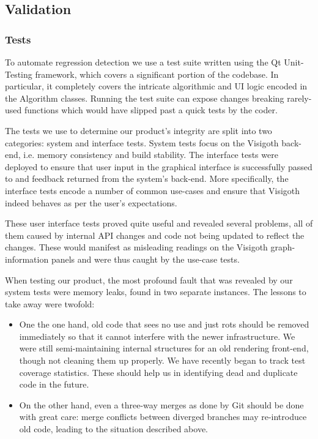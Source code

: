 \documentclass[a4paper,11pt,titlepage]{article}
\begin{document}
\subsection{Validation}

\subsubsection{Tests}
To automate regression detection we use a test suite written using
the Qt Unit-Testing framework, which covers a significant portion
of the codebase. In particular, it completely covers the intricate
algorithmic and UI logic encoded in the Algorithm classes. Running
the test suite can expose changes breaking rarely-used functions
which would have slipped past a quick tests by the coder.

The tests we use to determine our product's integrity are split
into two categories: system and interface tests. System tests focus
on the Visigoth back-end, i.e. memory consistency and build stability.
The interface tests were deployed to ensure that user input in the
graphical interface is successfully passed to and feedback returned
from the system's back-end. More specifically, the interface tests
encode a number of common use-cases and ensure that Visigoth indeed
behaves as per the user's expectations.

These user interface tests proved quite useful and revealed several
problems, all of them caused by internal API changes and code not
being updated to reflect the changes. These would manifest as
misleading readings on the Visigoth graph-information panels and
were thus caught by the use-case tests.

When testing our product, the most profound fault that was revealed
by our system tests were memory leaks, found in two separate
instances. The lessons to take away were twofold:
\begin{itemize}
  \item One the one hand, old code that sees no use and just rots
        should be removed immediately so that it cannot interfere
        with the newer infrastructure. We were still semi-maintaining
        internal structures for an old rendering front-end, though
        not cleaning them up properly. We have recently began to
        track test coverage statistics.  These should help us in
        identifying dead and duplicate code in the future.
  \item On the other hand, even a three-way merges as done by Git
        should be done with great care: merge conflicts between
        diverged branches may re-introduce old code, leading to
        the situation described above.
\end{itemize}
\end{document}
